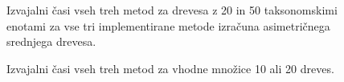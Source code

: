 \documentclass[a4paper, 12pt]{book}
\begin{document}
\clearpage
\begin{figure}[h!]
	\begin{center}
	\end{center}
	\caption{
		Izvajalni časi vseh treh metod za drevesa z 20 in 50 taksonomskimi enotami
	 	za vse tri implementirane metode izračuna asimetričnega srednjega drevesa. 
	}
	\label{img-eval-timing-trees}
\end{figure}
\begin{figure}[h!]
	\begin{center}
	\end{center}
	\caption{
		Izvajalni časi vseh treh metod za vhodne množice 10 ali 20 dreves.
	 }
	\label{img-eval-timing-taxons}
\end{figure}
\end{document}
